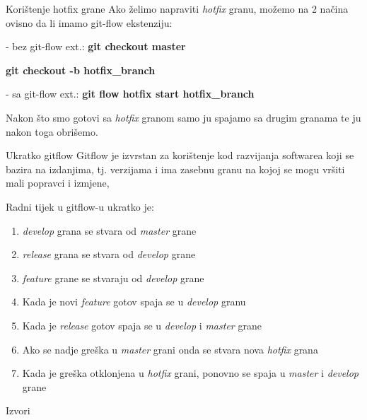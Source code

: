 \documentclass[10pt]{beamer}
\begin{document}
\begin{frame}{Korištenje hotfix grane}
Ako želimo napraviti \textit{hotfix} granu, možemo na 2 načina ovisno da li imamo git-flow ekstenziju:

- bez git-flow ext.: \textbf{git checkout master}

\textbf{git checkout -b hotfix\_branch}
                         
- sa git-flow ext.:  \textbf{git flow hotfix start hotfix\_branch}

Nakon što smo gotovi sa \textit{hotfix} granom samo ju spajamo sa drugim granama te ju nakon toga obrišemo.
\end{frame}
\begin{frame}{Ukratko gitflow}
Gitflow je izvrstan za korištenje kod razvijanja softwarea koji se bazira na izdanjima, tj. verzijama i ima zasebnu granu na kojoj se mogu vršiti mali popravci i izmjene,

Radni tijek u gitflow-u ukratko je:
\begin{enumerate}
    \item \textit{develop} grana se stvara od \textit{master} grane
    \item \textit{release} grana se stvara od \textit{develop} grane
    \item \textit{feature} grane se stvaraju od \textit{develop} grane
    \item Kada je novi \textit{feature} gotov spaja se u \textit{develop} granu
    \item Kada je \textit{release} gotov spaja se u \textit{develop} i \textit{master} grane
    \item Ako se nadje greška u \textit{master} grani onda se stvara nova \textit{hotfix} grana
    \item Kada je greška otklonjena u \textit{hotfix} grani, ponovno se spaja u \textit{master} i \textit{develop} grane
\end{enumerate}
\end{frame}
\begin{frame}{Izvori}
\nocite{Git}
\nocite{Git1}
\nocite{Git2}


\end{frame}
\end{document}
